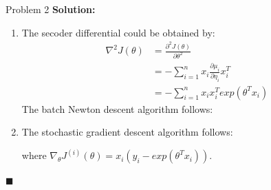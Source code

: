 \documentclass{article}
\newenvironment{solution}                               %
{\textbf{Solution:} }{$\blacksquare$}                   %
\begin{document}
\begin{section}{Problem 2}
\begin{solution}
\begin{enumerate}[label=(\alph*)]
                \item The secoder differential could be obtained by:
                \begin{align*}
                    \nabla^2 J(\theta) &= \frac{\partial^2 J(\theta)}{\partial \theta^2} \\
                    &= - \sum_{i=1}^{n} x_i \frac{\partial \mu_i}{\partial \eta_i} x_i^T \\
                    &= - \sum_{i=1}^{n} x_i x_i^T exp(\theta^T x_i)
                \end{align*}
                The batch Newton descent algorithm follows:\\
                \begin{algorithm}[H]
                    \DontPrintSemicolon
                \end{algorithm}
                
                \item The stochastic gradient descent algorithm follows:\\
                \begin{algorithm}[H]
                    \DontPrintSemicolon
                \end{algorithm}
                where $\nabla_{\theta} J^{(i)}(\theta) = x_i (y_i - exp(\theta^T x_i))$.
            \end{enumerate}
        \end{solution}


\end{section}
\end{document}
